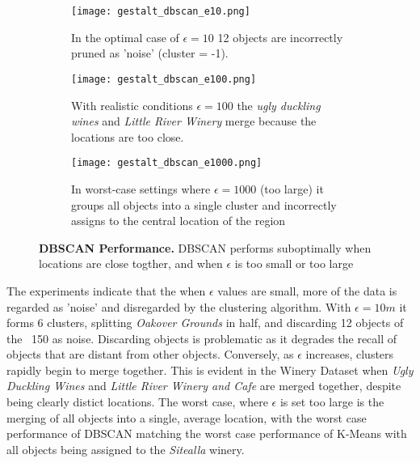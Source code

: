 \begin{figure*}[h]
\centering

\begin{subfigure}[t]{.3\textwidth}
\texttt{[image: gestalt\_dbscan\_e10.png]}
\caption{In the optimal case of $\epsilon=10$ 12 objects are incorrectly pruned as 'noise' (cluster = -1).} %
\label{fig:dbscan_optimal}
\end{subfigure}
\hfill
\begin{subfigure}[t]{.3\textwidth}
\texttt{[image: gestalt\_dbscan\_e100.png]}
\caption{\small With realistic conditions $\epsilon=100$ the \textit{ugly duckling wines} and \textit{Little River Winery} merge because the locations are too close.}
\label{fig:dbscan_realistic}
\end{subfigure}
\hfill
\begin{subfigure}[t]{.3\textwidth}
\texttt{[image: gestalt\_dbscan\_e1000.png]}
\caption{\small In worst-case settings where $\epsilon=1000$ (too large) it groups all objects into a single cluster and incorrectly assigns to the central location of the region}
\label{fig:kmeans_worst}
\hfill
\end{subfigure}

\caption{\textbf{DBSCAN Performance.} DBSCAN performs suboptimally when locations are close togther, and when $\epsilon$ is too small or too large}

\label{fig:dbscan_experiments}
\end{figure*}

The experiments indicate that the when $\epsilon$ values are small, more of the data is regarded as 'noise' and disregarded by the clustering algorithm. With $\epsilon=10m$ it forms 6 clusters, splitting \textit{Oakover Grounds} in half, and discarding 12 objects of the ~150 as noise. Discarding objects is problematic as it degrades the recall of objects that are distant from other objects. Conversely, as $\epsilon$ increases, clusters rapidly begin to merge together. This is evident in the Winery Dataset when \textit{Ugly Duckling Wines} and \textit{Little River Winery and Cafe} are merged together, despite being clearly distict locations. The worst case, where $\epsilon$ is set too large is the merging of all objects into a single, average location, with the worst case performance of DBSCAN matching the worst case performance of K-Means with all objects being assigned to the \textit{Sitealla} winery. 


